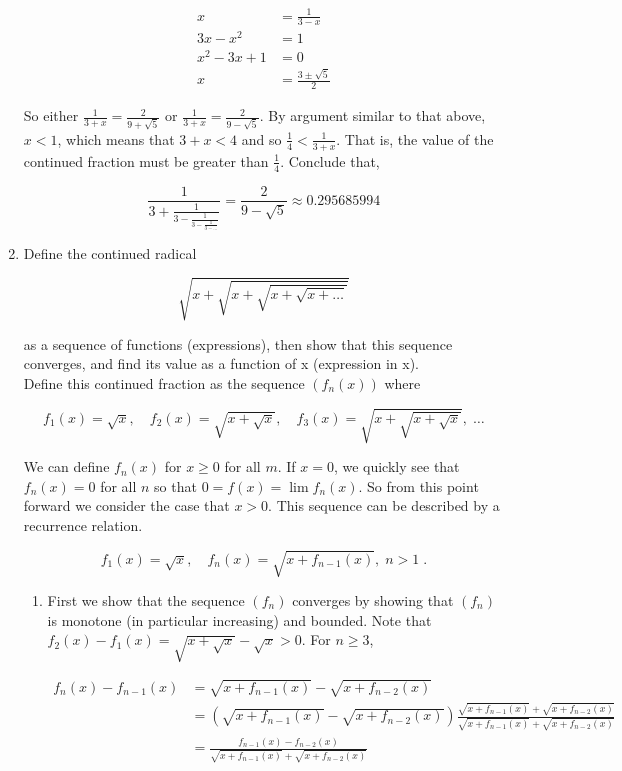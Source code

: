 \documentclass[a4paper]{article}
\begin{document}
\begin{enumerate}
\begin{align*}
x &= \frac{1}{3-x} \\
3x-x^2 &= 1 \\
x^2 - 3x + 1 &= 0 \\
x &= \frac{3 \pm \sqrt{5}}{2}
\end{align*}

So either $\frac{1}{3+x} = \frac{2}{9+\sqrt{5}}$ or $\frac{1}{3+x} = \frac{2}{9-\sqrt{5}}$. By argument similar to that above, $x < 1$, which means that $3+x < 4$ and so $\frac{1}{4} < \frac{1}{3+x}$. That is, the value of the continued fraction must be greater than $\frac{1}{4}$. Conclude that,

$$
\frac{1}{3 + 
	\frac{1}{3-
		\frac{1}{3 - 
			\frac{1}{3 - \dots
			}
		}
	}
}
= 
\frac{2}{9-\sqrt{5}} \approx 0.295685994
$$

\newpage
\item

Define the continued radical

$$
\sqrt{x+\sqrt{x+\sqrt{x+\sqrt{x+\dots}}}}
$$

as a sequence of functions (expressions), then show that this sequence converges, and find its value as a function of x (expression in x).\\

Define this continued fraction as the sequence $(f_n(x))$ where

$$
f_1(x) = \sqrt{x}, \quad f_2(x) = \sqrt{x+\sqrt{x}}, \quad
f_3(x) = \sqrt{x+\sqrt{x+\sqrt{x}}}, \; \dots
$$

We can define $f_n(x)$ for $x\geq 0$ for all $m$. If $x =0$, we quickly see that $f_n(x) = 0$ for all $n$ so that $0=f(x) = \lim f_n(x)$. So from this point forward we consider the case that $x > 0$. This sequence can be described by a recurrence relation.

$$
f_1(x) = \sqrt{x}, \quad
f_{n}(x) = \sqrt{x + f_{n-1}(x)}, \; n > 1 \;.
$$

\begin{enumerate}
\item
First we show that the sequence $(f_n)$ converges by showing that $(f_n)$ is monotone (in particular increasing) and bounded. Note that $f_2(x) - f_1(x) = \sqrt{x+\sqrt{x}} - \sqrt{x} > 0$. For $n \geq 3$,

\begin{align*}
f_n(x) - f_{n-1}(x) &= \sqrt{x + f_{n-1}(x)} - \sqrt{x + f_{n-2}(x)} \\
&= \left(\sqrt{x + f_{n-1}(x)} - \sqrt{x + f_{n-2}(x)}\right)
\frac{\sqrt{x + f_{n-1}(x)} + \sqrt{x + f_{n-2}(x)}}{\sqrt{x + f_{n-1}(x)} + \sqrt{x + f_{n-2}(x)}} \\
&= \frac{f_{n-1}(x) - f_{n-2}(x)}{\sqrt{x + f_{n-1}(x)} + \sqrt{x + f_{n-2}(x)}} \\
\end{align*}


\end{enumerate}
\end{enumerate}
\end{document}
